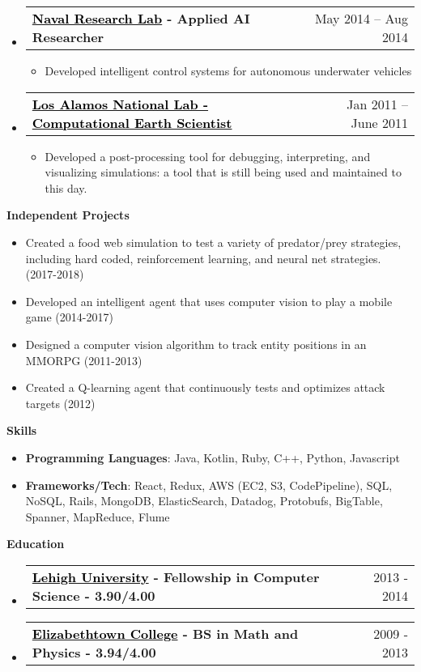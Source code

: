 \documentclass[letterpaper,12pt]{article}
\makeatletter
\newcommand{\link}[2]{\href{#1}{\textcolor{black}{#2}}}
\newcommand{\resitem}[1]{\item #1 \vspace{-2pt}}
\newcommand{\resheading}[1]{{\large \colorbox{mygrey}{\begin{minipage}{\textwidth}{\textbf{\sc #1 \vphantom{p\^{E}}}}\end{minipage}}}}
\newcommand{\miniheading}[2]{
	\begin{tabular*}{6.5in}{l@{\extracolsep{\fill}}r}
			\textbf{#1} & #2 \\
	\end{tabular*}\vspace{-6pt}
}
\makeatother
\begin{document}
\begin{itemize}
        \item \miniheading
            {\link{http://www.nrl.navy.mil/}{Naval Research Lab} - Applied AI Researcher}
            {May 2014 -- Aug 2014}
				\begin{itemize}
                    \resitem{Developed intelligent control systems for autonomous underwater vehicles}
               \end{itemize}
		\item \miniheading
            {\link{http://www.lanl.gov}{Los Alamos National Lab - Computational Earth Scientist}}
            {Jan 2011 -- June 2011}
				\begin{itemize}
					\resitem{Developed a post-processing tool for debugging, interpreting, and visualizing simulations: a tool that is still being used and maintained to this day.}
				\end{itemize}
	\end{itemize}
	
	
	\resheading{Independent Projects}
    \begin{itemize}
		\resitem{Created a food web simulation to test a variety of predator/prey strategies, including hard coded, reinforcement learning, and neural net strategies. (2017-2018)}
		\resitem{Developed an intelligent agent that uses computer vision to play a mobile game (2014-2017)}
		\resitem{Designed a computer vision algorithm to track entity positions in an MMORPG (2011-2013)}
		\resitem{Created a Q-learning agent that continuously tests and optimizes attack targets (2012)}
    \end{itemize}

\resheading{Skills}
	\begin{itemize}
		\resitem{\textbf{Programming Languages}: Java, Kotlin, Ruby, C++, Python, Javascript}
		\resitem{\textbf{Frameworks/Tech}: React, Redux, AWS (EC2, S3, CodePipeline), SQL, NoSQL, Rails, MongoDB, ElasticSearch, Datadog, Protobufs, BigTable, Spanner, MapReduce, Flume}
	\end{itemize} %

\resheading{Education}
	\begin{itemize}
        \item \miniheading
            {\link{http://www.cse.lehigh.edu/}{Lehigh University} - Fellowship in Computer Science - 3.90/4.00}
            {2013 - 2014}
        \item \miniheading
            {\link{http://www.etown.edu}{Elizabethtown College} - BS in Math and Physics - 3.94/4.00}
            {2009 - 2013}
	\end{itemize} %
    
\end{document}
